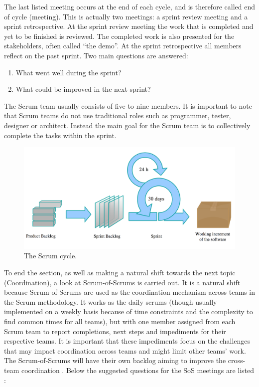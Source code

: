 The last listed meeting occurs at the end of each cycle, and is therefore called end of cycle (meeting). This is actually two meetings: a sprint review meeting and a sprint retrospective. At the sprint review meeting the work that is completed and yet to be finished is reviewed. The completed work is also presented for the stakeholders, often called  ``the demo''. At the sprint retrospective all members reflect on the past sprint. Two main questions are answered:

\begin{enumerate}
  \item What went well during the sprint?
  \item What could be improved in the next sprint?
\end{enumerate}

The Scrum team usually consists of five to nine members. It is important to note that Scrum teams do not use traditional roles such as programmer, tester, designer or architect. Instead the main goal for the Scrum team is to collectively complete the tasks within the sprint.

\begin{figure}[ht!]
\centering
\includegraphics[width=150mm]{images/chapters/development_models/Scrum.png}
\caption{The Scrum cycle.}
\label{scrum}
\end{figure}

To end the section, as well as making a natural shift towards the next topic (Coordination), a look at Scrum-of-Scrums is carried out. It is a natural shift because Scrum-of-Scrums are used as the coordination mechanism across teams in the Scrum methodology. It works as the daily scrums (though usually implemented on a weekly basis because of time constraints and the complexity to find common times for all teams), but with one member assigned from each Scrum team to report completions, next steps and impediments for their respective teams. It is important that these impediments focus on the challenges that may impact coordination across teams and might limit other teams' work. The Scrum-of-Scrums will have their own backlog aiming to improve the cross-team coordination \cite{Sutherland2001}. Below the suggested questions for the SoS meetings are listed \cite{Cohn2007}:


